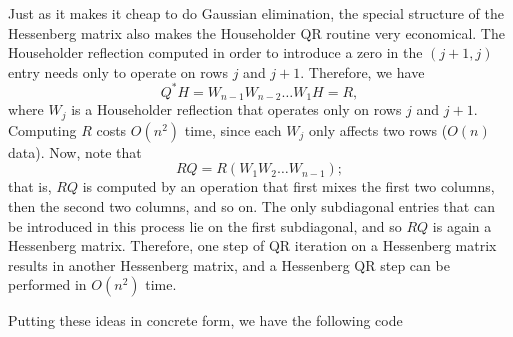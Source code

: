 \documentclass[12pt, leqno]{article} %
\begin{document}
Just as it makes it cheap to do Gaussian elimination, the special
structure of the Hessenberg matrix also makes the Householder QR
routine very economical.  The Householder reflection computed in order
to introduce a zero in the $(j+1,j)$ entry needs only to operate on
rows $j$ and $j+1$.  Therefore, we have
\[
  Q^* H = W_{n-1} W_{n-2} \ldots W_1 H = R,
\]
where $W_{j}$ is a Householder reflection that operates only on rows
$j$ and $j+1$.  Computing $R$ costs $O(n^2)$ time, since each $W_j$
only affects two rows ($O(n)$ data).  Now, note that
\[
  R Q = R (W_1 W_2 \ldots W_{n-1});
\]
that is, $RQ$ is computed by an operation that first mixes the first
two columns, then the second two columns, and so on.  The only subdiagonal
entries that can be introduced in this process lie on the first subdiagonal,
and so $RQ$ is again a Hessenberg matrix.  Therefore, one step of QR iteration
on a Hessenberg matrix results in another Hessenberg matrix, and a Hessenberg
QR step can be performed in $O(n^2)$ time.

Putting these ideas in concrete form, we have the following code

\end{document}
